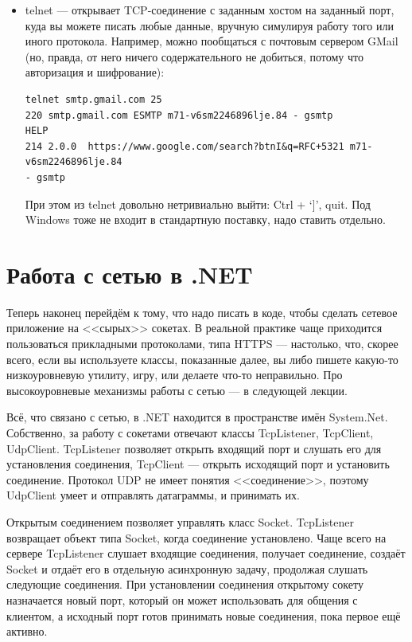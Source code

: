 \documentclass{../../text-style}
\begin{document}
\begin{itemize}
    \item telnet --- открывает TCP-соединение с заданным хостом на заданный порт, куда вы можете писать любые данные, вручную симулируя работу того или иного протокола. Например, можно пообщаться с почтовым сервером GMail (но, правда, от него ничего содержательного не добиться, потому что авторизация и шифрование):
        \begin{verbatim}
telnet smtp.gmail.com 25
220 smtp.gmail.com ESMTP m71-v6sm2246896lje.84 - gsmtp
HELP
214 2.0.0  https://www.google.com/search?btnI&q=RFC+5321 m71-v6sm2246896lje.84 
- gsmtp
        \end{verbatim}
        При этом из telnet довольно нетривиально выйти: Ctrl + `]', quit. Под Windows тоже не входит в стандартную поставку, надо ставить отдельно.
\end{itemize}

\section{Работа с сетью в .NET}

Теперь наконец перейдём к тому, что надо писать в коде, чтобы сделать сетевое приложение на <<сырых>> сокетах. В реальной практике чаще приходится пользоваться прикладными протоколами, типа HTTPS --- настолько, что, скорее всего, если вы используете классы, показанные далее, вы либо пишете какую-то низкоуровневую утилиту, игру, или делаете что-то неправильно. Про высокоуровневые механизмы работы с сетью --- в следующей лекции.

Всё, что связано с сетью, в .NET находится в пространстве имён System.Net. Собственно, за работу с сокетами отвечают классы TcpListener, TcpClient, UdpClient. TcpListener позволяет открыть входящий порт и слушать его для установления соединения, TcpClient --- открыть исходящий порт и установить соединение. Протокол UDP не имеет понятия <<соединение>>, поэтому UdpClient умеет и отправлять датаграммы, и принимать их.

Открытым соединением позволяет управлять класс Socket. TcpListener возвращает объект типа Socket, когда соединение установлено. Чаще всего на сервере TcpListener слушает входящие соединения, получает соединение, создаёт Socket и отдаёт его в отдельную асинхронную задачу, продолжая слушать следующие соединения. При установлении соединения открытому сокету назначается новый порт, который он может использовать для общения с клиентом, а исходный порт готов принимать новые соединения, пока первое ещё активно.
\end{document}
